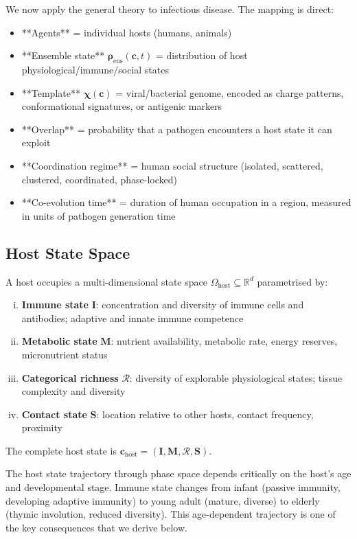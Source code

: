 \documentclass[11pt,twocolumn,a4paper]{article}
\newcommand{\R}{\mathbb{R}}
\newcommand{\Template}{\boldsymbol{\chi}}
\newcommand{\State}{\boldsymbol{\rho}}
\begin{document}
We now apply the general theory to infectious disease. The mapping is direct:
\begin{itemize}
\item **Agents** = individual hosts (humans, animals)
\item **Ensemble state** $\State_{\mathrm{ens}}(\mathbf{c}, t)$ = distribution of host physiological/immune/social states
\item **Template** $\Template(\mathbf{c})$ = viral/bacterial genome, encoded as charge patterns, conformational signatures, or antigenic markers
\item **Overlap** = probability that a pathogen encounters a host state it can exploit
\item **Coordination regime** = human social structure (isolated, scattered, clustered, coordinated, phase-locked)
\item **Co-evolution time** = duration of human occupation in a region, measured in units of pathogen generation time
\end{itemize}

\subsection{Host State Space}

\begin{definition}
A host occupies a multi-dimensional state space $\Omega_{\mathrm{host}} \subseteq \R^d$ parametrised by:
\begin{enumerate}[(i)]
\item \textbf{Immune state} $\mathbf{I}$: concentration and diversity of immune cells and antibodies; adaptive and innate immune competence
\item \textbf{Metabolic state} $\mathbf{M}$: nutrient availability, metabolic rate, energy reserves, micronutrient status
\item \textbf{Categorical richness} $\mathcal{R}$: diversity of explorable physiological states; tissue complexity and diversity
\item \textbf{Contact state} $\mathbf{S}$: location relative to other hosts, contact frequency, proximity
\end{enumerate}
The complete host state is $\mathbf{c}_{\mathrm{host}} = (\mathbf{I}, \mathbf{M}, \mathcal{R}, \mathbf{S})$.
\end{definition}

\begin{remark}
The host state trajectory through phase space depends critically on the host's age and developmental stage. Immune state changes from infant (passive immunity, developing adaptive immunity) to young adult (mature, diverse) to elderly (thymic involution, reduced diversity). This age-dependent trajectory is one of the key consequences that we derive below.
\end{remark}
\end{document}
